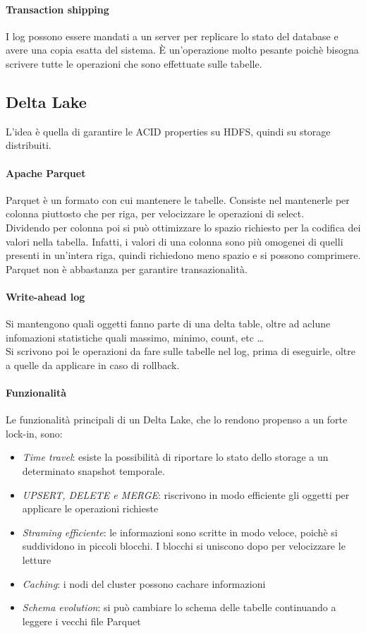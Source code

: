 \paragraph{Transaction shipping}
I log possono essere mandati a un server per replicare lo stato del database e avere
una copia esatta del sistema. È un'operazione molto pesante poichè bisogna scrivere
tutte le operazioni che sono effettuate sulle tabelle.

\subsection{Delta Lake}
L'idea è quella di garantire le ACID properties su HDFS, quindi su 
storage distribuiti.

\paragraph{Apache Parquet}
Parquet è un formato con cui mantenere le tabelle. Consiste nel mantenerle 
per colonna piuttosto che per riga, per velocizzare le operazioni di select.\\
Dividendo per colonna poi si può ottimizzare lo spazio richiesto per la codifica
dei valori nella tabella. Infatti, i valori di una colonna sono più omogenei
di quelli presenti in un'intera riga, quindi richiedono meno spazio e si possono
comprimere. Parquet non è abbastanza per garantire transazionalità.

\paragraph{Write-ahead log} 
Si mantengono quali oggetti fanno parte di una delta table, oltre ad 
aclune infomazioni statistiche quali massimo, minimo, count, etc \dots\\
Si scrivono poi le operazioni da fare sulle tabelle nel log, prima di eseguirle, 
oltre a quelle da applicare in caso di rollback.

\paragraph{Funzionalità}
Le funzionalità principali di un Delta Lake, che lo rendono propenso a un forte lock-in, sono:
\begin{itemize}
    \item \emph{Time travel}: esiste la possibilità di riportare lo stato dello storage a un determinato
    snapshot temporale.
    \item \emph{UPSERT, DELETE e MERGE}: riscrivono in modo efficiente gli oggetti per 
    applicare le operazioni richieste
    \item \emph{Straming efficiente}: le informazioni sono scritte in modo veloce, poichè 
    si suddividono in piccoli blocchi. I blocchi si uniscono dopo per velocizzare le letture
    \item \emph{Caching}: i nodi del cluster possono cachare informazioni
    \item \emph{Schema evolution}: si può cambiare lo schema delle tabelle continuando 
    a leggere i vecchi file Parquet 
\end{itemize}


